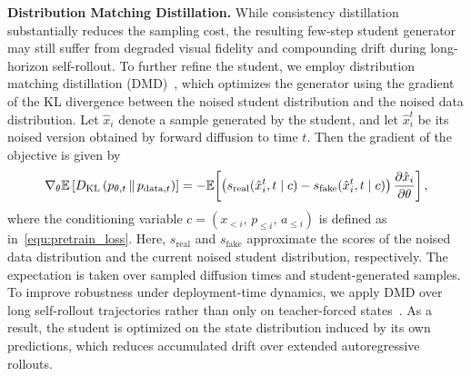 %
\noindent\textbf{Distribution Matching Distillation.}
%
While consistency distillation substantially reduces the sampling cost, the resulting few-step student generator may still suffer from degraded visual fidelity and compounding drift during long-horizon self-rollout.
%
To further refine the student, we employ distribution matching distillation (DMD)~\cite{yin2024dmd}, which optimizes the generator using the gradient of the KL divergence between the noised student distribution and the noised data distribution.
%
Let $\hat{x}_i$ denote a sample generated by the student, and let $\hat{x}_i^t$ be its noised version obtained by forward diffusion to time $t$.
%
Then the gradient of the objective is given by
\begin{equation}
\label{equ:dmd_loss}
    \nabla_\theta \mathbb{E}\left[D_{\mathrm{KL}}\left(p_{\theta,t} \,\|\, p_{\mathrm{data},t}\right)\right]
    =
    - \mathbb{E}\!\left[
    \left(
    s_{\mathrm{real}}(\hat{x}_i^t, t \mid c)
    -
    s_{\mathrm{fake}}(\hat{x}_i^t, t \mid c)
    \right)
    \frac{\partial \hat{x}_i}{\partial \theta}
    \right],
\end{equation}
%
where the conditioning variable $c = (x_{<i},\, p_{\le i},\, a_{\le i})$ is defined as in~\cref{equ:pretrain_loss}.
%
Here, $s_{\mathrm{real}}$ and $s_{\mathrm{fake}}$ approximate the scores of the noised data distribution and the current noised student distribution, respectively. The expectation is taken over sampled diffusion times and student-generated samples.
%
To improve robustness under deployment-time dynamics, we apply DMD over long self-rollout trajectories rather than only on teacher-forced states~\cite{huang2025self}. 
%
As a result, the student is optimized on the state distribution induced by its own predictions, which reduces accumulated drift over extended autoregressive rollouts.